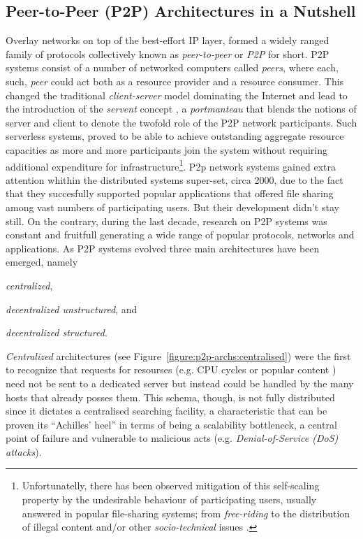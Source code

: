 \documentclass[acmcsur,acmnow]{acmtrans2m}
\begin{document}
\subsection{Peer-to-Peer (P2P) Architectures in a Nutshell}
Overlay networks on top of the best-effort IP layer, formed a widely ranged family of protocols collectively known as \emph{peer-to-peer} or \emph{P2P} for short. P2P systems consist of a number of networked computers called \emph{peers}, where each, such, \emph{peer} could act both as a resource provider and a resource consumer. This changed the traditional \emph{client-server} model dominating the Internet and lead to the introduction of the \emph{servent} concept \cite{gnutella}, a \emph{portmanteau} that blends the notions of server and client to denote the twofold role of the P2P network participants. Such serverless systems, proved to be able to achieve outstanding aggregate resource capacities as more and more participants join the system without requiring additional expenditure for infrastructure\footnote{
        Unfortunatelly, there has been observed mitigation of this self-scaling property by the undesirable behaviour of participating users, usually answered in popular file-sharing systems; from \emph{free-riding} \cite{saroiu_measurefileshare_2002, adar_gnutellafreeriders_2000, hughes_gnutellafreeride_2005} to the distribution of illegal content and/or other \emph{socio-technical} issues \cite{hughes_socp2p_2008}.
}.
P2p network systems gained extra attention whithin the distributed systems super-set, circa 2000, due to the fact that they succesfully supported popular applications that offered file sharing among vast numbers of participating users. But their development didn't stay still. On the contrary, during the last decade, research on P2P systems was constant and fruitfull generating a wide range of popular protocols, networks and applications. As P2P systems evolved three main architectures have been emerged, namely
\begin{inparaenum}
  \item \emph{centralized},
  \item \emph{decentralized unstructured}, and
  \item \emph{decentralized structured}.
\end{inparaenum}

\emph{Centralized} architectures (see Figure~\ref{figure:p2p-archs:centralised}) were the first to recognize that requests for resourses (e.g. CPU cycles \cite{seti} or popular content 
\cite{}) need not be sent to a dedicated server but instead could be handled by the many hosts that already posses them. This schema, though, is not fully distributed since it dictates a centralised searching facility, a characteristic that can be proven its ``Achilles' heel'' in terms of being a scalability bottleneck, a central point of failure and vulnerable to malicious acts (e.g. \emph{Denial-of-Service (DoS) attacks}).
\end{document}
